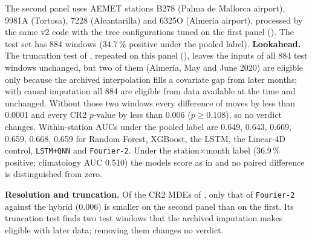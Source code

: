 \documentclass[11pt,a4paper]{article}
\begin{document}
The second panel uses AEMET stations B278 (Palma de Mallorca airport), 9981A (Tortosa), 7228 (Alcantarilla) and 6325O (Almería airport), processed by the same v2 code with the tree configurations tuned on the first panel (). The test set has 884 windows (34.7\,\% positive under the pooled label). \textbf{Lookahead.} The truncation test of , repeated on this panel (), leaves the inputs of all 884 test windows unchanged, but two of them (Almería, May and June 2020) are eligible only because the archived interpolation fills a covariate gap from later months; with causal imputation all 884 are eligible from data available at the time and unchanged. Without those two windows every difference of  moves by less than 0.0001 and every CR2 $p$-value by less than 0.006 ($p\ge0.108$), so no verdict changes. Within-station AUCs under the pooled label are 0.649, 0.643, 0.669, 0.659, 0.668, 0.659 for Random Forest, XGBoost, the LSTM, the Linear-4D control, \texttt{LSTM+QNN} and \texttt{Fourier-2}. Under the station$\times$month label (36.9\,\% positive; climatology AUC 0.510) the models score as in  and no paired difference is distinguished from zero.

\textbf{Resolution and truncation.} Of the CR2 MDEs of , only that of \texttt{Fourier-2} against the hybrid (0.006) is smaller on the second panel than on the first. Its truncation test finds two test windows that the archived imputation makes eligible with later data; removing them changes no verdict.

\begin{table}[htbp]
\centering
\caption{Second panel, station$\times$month label (884 test rows): 15-seed mean AUC (SD) and paired comparisons (DeLong $p$, year-block 95\,\% interval, DeLong MDE).}
\label{tab:panel2_sm}
{\small
{}}
\end{table}
\end{document}
